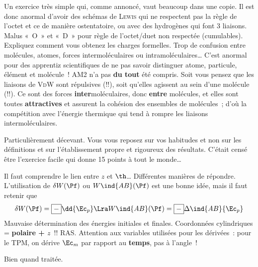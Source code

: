 \documentclass[a4paper, 10pt, final, garamond]{book}
\begin{document}
\setcounter{section}{0}
Un exercice très simple qui, comme annoncé, vaut beaucoup dans une copie. Il est
donc anormal d'avoir des schémas de \textsc{Lewis} qui ne respectent pas la
règle de l'octet et ce de manière ostentatoire, ou avec des hydrogènes qui font
3 liaisons. Malus «~O~» et «~D~» pour règle de l'octet/duet non respectée
(cumulables).
\smallbreak
Expliquez comment vous obtenez les charges formelles.
\smallbreak
Trop de confusion entre molécules, atomes, forces intermoléculaires ou
intramoléculaires… C'est anormal pour des apprentiz scientifiques de ne pas
savoir distinguer atome, particule, élément et molécule~!
\smallbreak
AM2 n'a pas \textbf{du tout} été compris. Soit vous pensez que les liaisons de
\textsc{VdW} sont répulsives (!!), soit qu'elles agissent au sein d'une molécule
(!!). Ce sont des forces \textbf{inter}moléculaires, donc \textbf{entre}
molécules, et elles sont toutes \textbf{attractives} et assurent la cohésion des
ensembles de molécules~; d'où la compétition avec l'énergie thermique qui tend à
rompre les liaisons intermoléculaires.

Particulièrement décevant. Vous vous reposez sur vos habitudes et non sur les
définitions et sur l'établissement propre et rigoureux des résultats. C'était
censé être l'exercice facile qui donne 15 points à tout le monde…
\begin{enumerate}
	Il faut comprendre le lien entre $z$ et $\th$…
	Différentes manières de répondre. L'utilisation de $\delta W(\Pf)$ ou
	$W\ind{AB}(\Pf)$ est une bonne idée, mais il faut retenir que
	\[
		\delta W(\Pf) = \boxed{-}\dd{\Ec_p}
		\Lra
		W\ind{AB}(\Pf) = \boxed{-}\Delta\ind{AB}{\Ec_p}
	\]
	Mauvaise détermination des énergies initiales et finales.
	Coordonnées cylindriques = \textbf{polaire + $z$}~!!
	RAS.
	Attention aux variables utilisées pour les dérivées~: pour le TPM, on dérive
	$\Ec_m$ par rapport au \textbf{temps}, pas à l'angle~!
	\begin{center}
	\end{center}
	Bien quand traitée.
\end{enumerate}
\end{document}
